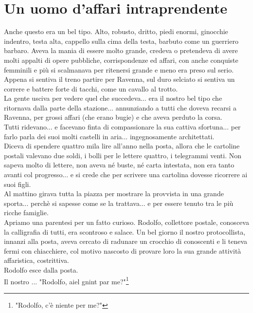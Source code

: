 \documentclass[10pt]{memoir} %
\begin{document}
\chapter{Un uomo d'affari intraprendente}
Anche questo era un bel tipo. Alto, robusto, dritto, piedi enormi, ginocchie indentro, testa alta, cappello sulla cima della testa, barbuto come un guerriero barbaro. Aveva la mania di essere molto grande, credeva o pretendeva di avere molti appalti di opere pubbliche, corrispondenze ed affari, con anche conquiste femminili e più si scalmanava per ritenersi grande e meno era preso sul serio.\\
Appena si sentiva il treno partire per Ravenna, sul duro selciato si sentiva un correre e battere forte di tacchi, come un cavallo al trotto.\\
La gente usciva per vedere quel che succedeva... era il nostro bel tipo che ritornava dalla parte della stazione... annunziando a tutti che doveva recarsi a Ravenna, per grossi affari (che erano bugie) e che aveva perduto la corsa.\\
Tutti ridevano... e facevano finta di compassionare la sua cattiva sfortuna... per farlo parla dei suoi molti castelli in aria... ingegnosamente architettati.\\
Diceva di spendere quattro mila lire all'anno nella posta, allora che le cartoline postali valevano due soldi, i bolli per le lettere quattro, i telegrammi venti. Non sapeva molto di lettere, non aveva né buste, né carta intestata, non era tanto avanti col progresso... e si crede che per scrivere una cartolina dovesse ricorrere ai suoi figli. \\
Al mattino girava tutta la piazza per mostrare la provvista in una grande sporta... perchè si sapesse come se la trattava... e per essere tenuto tra le più ricche famiglie.\\
Apriamo una parentesi per un fatto curioso. Rodolfo, collettore postale, conosceva la calligrafia di tutti, era scontroso e salace. Un bel giorno il nostro protocollista, innanzi alla posta, aveva cercato di radunare un crocchio di conoscenti e li teneva fermi con chiacchiere, col motivo nascosto di provare loro la sua grande attività affaristica, costrittiva. \\
Rodolfo esce dalla posta.\\
Il nostro .\:.\:.\: "Rodolfo, aiel gnint par me?"\footnote{"Rodolfo, c'è niente per me?"}\\
\end{document}
